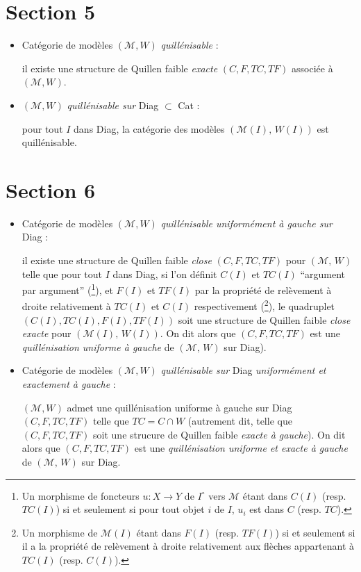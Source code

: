 \documentclass[11pt]{article}
\newcommand{\printedpage}[1]{\marginpar{\footnotesize p.~#1}}
\newcommand{\Mo}{\mathcal{M}}
\begin{document}
\section*{Section 5}

\begin{itemize}
\item[\textbullet] Catégorie de modèles $(\Mo,W)$ \textit{quillénisable} :

il existe une structure de Quillen faible \textit{exacte} $(C,F,TC,TF)$ associée à $(\Mo,W)$.

\item[\textbullet] $(\Mo,W)$ \textit{quillénisable sur} Diag $\subset$ Cat :

pour tout $I$ dans Diag, la catégorie des modèles $(\Mo(I),\, W(I))$ est quillénisable.
\end{itemize}

\section*{Section 6}

\begin{itemize}
\item[\textbullet] Catégorie de modèles $(\Mo,W)$ \textit{quillénisable uniformément à gauche sur} Diag :

il existe une structure de Quillen faible \textit{close} $(C,F,TC,TF)$ pour $(\Mo,\, W)$ telle que pour tout $I$ dans Diag, si l'on définit $C(I)$ et $TC(I)$ “argument par argument” (\footnote{Un morphisme de foncteurs $u : X \longrightarrow Y$ de $I^{\circ}$ vers $\Mo$ étant dans $C(I)$ (resp. $TC(I)$) si et seulement si pour tout objet $i$ de $I$, $u_i$ est dans $C$ (resp. $TC$).}), et $F(I)$ et $TF(I)$ par la propriété de relèvement à droite relativement à $TC(I)$ et $C(I)$ respectivement (\footnote{Un morphisme de $\Mo(I)$ étant dans $F(I)$ (resp. $TF(I)$) si et seulement si il a la propriété de relèvement à droite relativement aux flèches appartenant à $TC(I)$ (resp. $C(I)$).}), le quadruplet $(C(I),TC(I),F(I),TF(I))$ soit une structure de Quillen faible \textit{close exacte} pour $(\Mo(I),\, W(I))$. On dit alors que $(C,F,TC,TF)$ est une \textit{quillénisation uniforme à gauche} de $(\Mo,\, W)$ sur Diag).
\end{itemize}

\printedpage{62}

\begin{itemize}
\item[\textbullet] Catégorie de modèles $(\Mo,W)$ \textit{quillénisable sur} Diag \textit{uniformément et exactement à gauche} :

$(\Mo,W)$ admet une quillénisation uniforme à gauche sur Diag $(C,F,TC,TF)$ telle que $TC = C \cap W$ (autrement dit, telle que $(C,F,TC,TF)$ soit une strucure de Quillen faible \textit{exacte à gauche}). On dit alors que $(C,F,TC,TF)$ est une \textit{quillénisation uniforme et exacte à gauche} de $(\Mo,\, W)$ sur Diag. %
\end{itemize}
\end{document}
